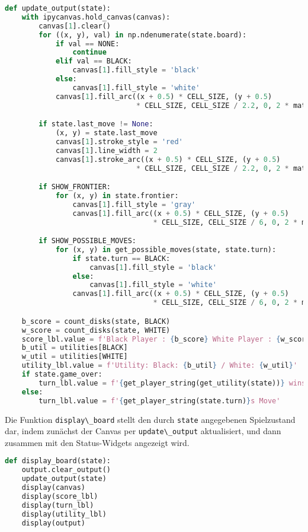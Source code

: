 \begin{lstlisting}[language=Python]
def update_output(state):
    with ipycanvas.hold_canvas(canvas):
        canvas[1].clear()
        for ((x, y), val) in np.ndenumerate(state.board):
            if val == NONE:
                continue
            elif val == BLACK:
                canvas[1].fill_style = 'black'
            else:
                canvas[1].fill_style = 'white'
            canvas[1].fill_arc((x + 0.5) * CELL_SIZE, (y + 0.5)
                               * CELL_SIZE, CELL_SIZE / 2.2, 0, 2 * math.pi)

        if state.last_move != None:
            (x, y) = state.last_move
            canvas[1].stroke_style = 'red'
            canvas[1].line_width = 2
            canvas[1].stroke_arc((x + 0.5) * CELL_SIZE, (y + 0.5)
                               * CELL_SIZE, CELL_SIZE / 2.2, 0, 2 * math.pi)

        if SHOW_FRONTIER:
            for (x, y) in state.frontier:
                canvas[1].fill_style = 'gray'
                canvas[1].fill_arc((x + 0.5) * CELL_SIZE, (y + 0.5)
                                   * CELL_SIZE, CELL_SIZE / 6, 0, 2 * math.pi)

        if SHOW_POSSIBLE_MOVES:
            for (x, y) in get_possible_moves(state, state.turn):
                if state.turn == BLACK:
                    canvas[1].fill_style = 'black'
                else:
                    canvas[1].fill_style = 'white'
                canvas[1].fill_arc((x + 0.5) * CELL_SIZE, (y + 0.5)
                                   * CELL_SIZE, CELL_SIZE / 6, 0, 2 * math.pi)

    b_score = count_disks(state, BLACK)
    w_score = count_disks(state, WHITE)
    score_lbl.value = f'Black Player : {b_score} White Player : {w_score}'
    b_util = utilities[BLACK]
    w_util = utilities[WHITE]
    utility_lbl.value = f'Utility: Black: {b_util} / White: {w_util}'
    if state.game_over:
        turn_lbl.value = f'{get_player_string(get_utility(state))} wins'
    else:
        turn_lbl.value = f'{get_player_string(state.turn)}s Move'
\end{lstlisting}

Die Funktion \passthrough{\lstinline!display\_board!} stellt den durch
\passthrough{\lstinline!state!} angegebenen Spielzustand dar, indem
zunächst der Canvas per \passthrough{\lstinline!update\_output!}
aktualisiert, und dann zusammen mit den Status-Widgets angezeigt wird.

\begin{lstlisting}[language=Python]
def display_board(state):
    output.clear_output()
    update_output(state)
    display(canvas)
    display(score_lbl)
    display(turn_lbl)
    display(utility_lbl)
    display(output)
\end{lstlisting}

